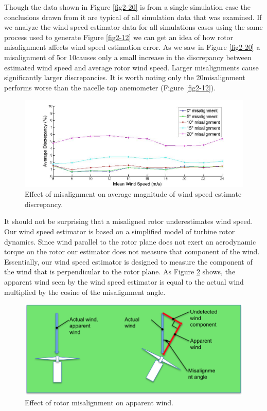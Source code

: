 Though the data shown in Figure \ref{fig2-20} is from a single simulation case the conclusions drawn from it are typical of all simulation data that was examined. If we analyze the wind speed estimator data for all simulations cases using the same process used to generate Figure \ref{fig2-12} we can get an idea of how rotor misalignment affects wind speed estimation error. As we saw in Figure \ref{fig2-20} a misalignment of 5\degree or 10\degree causes only a small increase in the discrepancy between estimated wind speed and average rotor wind speed. Larger misalignments cause significantly larger discrepancies. It is worth noting only the 20\degree misalignment performs worse than the nacelle top anemometer (Figure \ref{fig2-12}).

\begin{figure}[htbp]
	\centering
		\includegraphics[width = \linewidth]{Figures/ch2Figures/fig2-21.jpg}
		
	\caption{Effect of misalignment on average magnitude of wind speed estimate discrepancy.}
	\label{fig2-21}
\end{figure}


It should not be surprising that a misaligned rotor underestimates wind speed. Our wind speed estimator is based on a simplified model of turbine rotor dynamics. Since wind parallel to the rotor plane does not exert an aerodynamic torque on the rotor our estimator does not measure that component of the wind. Essentially, our wind speed estimator is designed to measure the component of the wind that is perpendicular to the rotor plane. As Figure \ref{fig2-22} shows, the apparent wind seen by the wind speed estimator is equal to the actual wind multiplied by the cosine of the misalignment angle.

\begin{figure}[htbp]
	\centering
		\includegraphics[width=\textwidth]{Figures/ch2Figures/fig2-22.png}
		
	\caption{Effect of rotor misalignment on apparent wind.}
	\label{fig2-22}
\end{figure}

